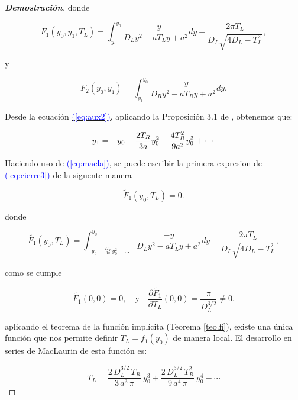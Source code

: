\documentclass[12pt,a4paper]{report} %
\newcommand{\eref}[1]{\hyperref[#1]{\textcolor{blue}{(\ref*{#1})}}}
\newcommand{\eref}[1]{\hyperref[#1]{\textcolor{blue}{\textit{(\ref*{#1})}}}}
\begin{document}
\begin{proof}[\textbf{Demostración}]
	\noindent donde
	
	\begin{equation}
		\label{eq:aux1}
		F_1(y_0,y_1,T_L)=\int_{y_1}^{y_0}\frac{-y}{D_Ly^2-aT_Ly+a^2}dy-\frac{2\pi T_L}{D_L\sqrt{4D_L-T_L^2}},
	\end{equation}\smallskip
	
	\noindent y
	
	\begin{equation}
		\label{eq:aux2}
		F_2(y_0,y_1)=\int_{y_1}^{y_0}\frac{-y}{D_Ry^2-aT_Ry+a^2}dy.
	\end{equation}\smallskip
	
	\noindent Desde la ecuación \eref{eq:aux2}, aplicando la Proposición 3.1 de \cite{properties}, obtenemos que:
	
		\begin{equation}
		\label{eq:macla}
		\scalebox{1}{$\displaystyle
			y_1=-y_0-\frac{2T_R}{3a}y_0^2-\frac{4T_R^2}{9a^2}y_0^3+\cdots
			$}
	\end{equation}\smallskip
	
	\noindent Haciendo uso de \eref{eq:macla}, se puede escribir la primera expresion de \eref{eq:cierre3} de la siguente manera
	
	\begin{equation}
		\label{eq:f1nuevo}
		\tilde{F}_1(y_0,T_L)=0.
	\end{equation}\smallskip
	
	\noindent donde
	
	\begin{equation}
		\label{eq:macla2}
				\tilde{F_1}(y_0,T_L)=\int_{-y_0-\frac{2T_R}{3a}y_0^2+...}^{y_0}\frac{-y}{D_Ly^2-aT_Ly+a^2}dy-\frac{2\pi T_L}{D_L\sqrt{4D_L-T_L^2}},
	\end{equation}\smallskip

	\noindent como se cumple
	
	\begin{equation}
		\label{dpar}
		\tilde{F_1}(0,0)=0, \quad \text{y}\quad\frac{\partial \tilde{F_1}}{\partial T_L}(0,0)=\frac{\pi}{D_L^{3/2}}\neq0.
	\end{equation}\smallskip
	
	\noindent aplicando el teorema de la función implícita (Teorema \ref{teo.fi}), existe una única función que nos permite definir $T_L=f_1(y_0)$ de manera local. El desarrollo en series de MacLaurin de esta función es:
	
	\begin{equation}
		\label{macla3}
		T_L=\frac{2\, D_L^{3/2}\, T_R}{3\, a^3 \, \pi}\: y_0^3+\frac{2\, D_L^{3/2}\, T_R^2}{9\, a^4 \, \pi}\: y_0^4-\cdots
	\end{equation}\smallskip
	

\end{proof}
\end{document}
